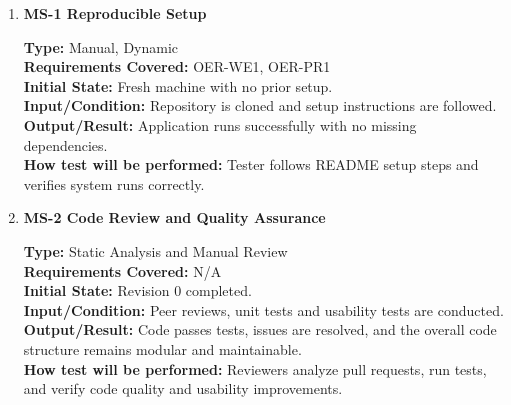 \documentclass[12pt, titlepage]{article}
\begin{document}
\begin{enumerate}

\item \textbf{MS-1 Reproducible Setup}

\textbf{Type:} Manual, Dynamic \\
\textbf{Requirements Covered:} OER-WE1, OER-PR1\\
\textbf{Initial State:} Fresh machine with no prior setup. \\
\textbf{Input/Condition:} Repository is cloned and setup instructions are followed. \\
\textbf{Output/Result:} Application runs successfully with no missing dependencies. \\
\textbf{How test will be performed:} Tester follows README setup steps and verifies system runs correctly. \\

\vspace{0.5em}

\item \textbf{MS-2 Code Review and Quality Assurance}

\textbf{Type:} Static Analysis and Manual Review \\
\textbf{Requirements Covered:} N/A\\
\textbf{Initial State:} Revision 0 completed. \\
\textbf{Input/Condition:} Peer reviews, unit tests and usability tests are conducted. \\
\textbf{Output/Result:} Code passes tests, issues are resolved, and the overall code structure remains modular and maintainable. \\
\textbf{How test will be performed:} Reviewers analyze pull requests, run tests, and verify code quality and usability improvements. \\

\end{enumerate}
\end{document}
